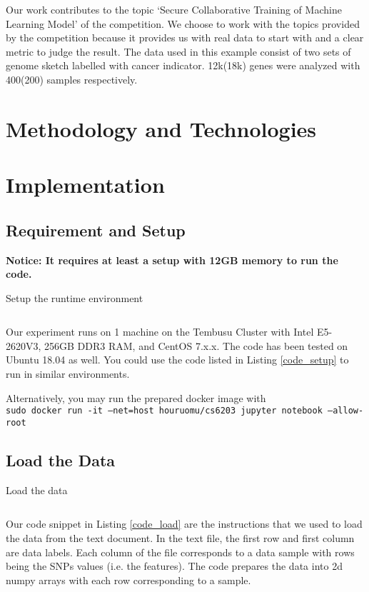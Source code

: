\documentclass[a4paper,12pt]{article}
\begin{document}
Our work contributes to the topic `Secure Collaborative Training of Machine Learning Model' of the competition. We choose to work with the topics provided by the competition because it provides us with real data to start with and a clear metric to judge the result. The data used in this example consist of two sets of genome sketch labelled with cancer indicator. 12k(18k) genes were analyzed with 400(200) samples respectively. 
\section{Methodology and Technologies}

\section{Implementation}
\subsection{Requirement and Setup}
\textbf{Notice: It requires at least a setup with 12GB memory to run the code.}

\begin{listing}[H]
	\caption{Setup the runtime environment}
	\inputminted[frame=single,framesep=10pt,linenos]{bash}{1_prep.sh}
	\label{code_setup}
\end{listing}

Our experiment runs on 1 machine on the Tembusu Cluster with Intel E5-2620V3, 256GB DDR3 RAM, and CentOS 7.x.x. The code has been tested on Ubuntu 18.04 as well. You could use the code listed in Listing \ref{code_setup} to run in similar environments.  

Alternatively, you may run the prepared docker image with\\
\texttt{sudo docker run -it --net=host houruomu/cs6203 jupyter notebook --allow-root}

\subsection{Load the Data}
\begin{listing}[H]
	\caption{Load the data}
	\inputminted[frame=single,framesep=10pt,linenos]{python3}{load_data.py}
	\label{code_load}
\end{listing}
Our code snippet in Listing \ref{code_load} are the instructions that we used to load the data from the text document. In the text file, the first row and first column are data labels. Each column of the file corresponds to a data sample with rows being the SNPs values (i.e. the features). The code prepares the data into 2d numpy arrays with each row corresponding to a sample.
\end{document}
